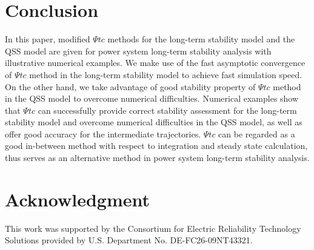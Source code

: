 \documentclass[journal]{IEEEtran}
\begin{document}
\section{Conclusion}\label{sectionconclusion}
In this paper, modified $\Psi tc$ methods for the long-term stability model and the QSS model are given for power system long-term stability analysis with illustrative numerical examples. We make use of the fast asymptotic convergence of $\Psi tc$ method in the long-term stability model to achieve fast simulation speed. On the other hand, we take advantage of good stability property of $\Psi tc$ method in the QSS model to overcome numerical difficulties. Numerical examples show that $\Psi tc$  can successfully provide correct stability assessment for the long-term stability model and overcome numerical difficulties in the QSS model, as well as offer good accuracy for the intermediate trajectories. $\Psi tc$ can be regarded as a good in-between method with respect to integration and steady state calculation, thus serves as an alternative method in power system long-term stability analysis.

\section{Acknowledgment}
This work was supported by the Consortium for Electric Reliability Technology Solutions provided by U.S. Department No. DE-FC26-09NT43321.


















\appendices























\ifCLASSOPTIONcaptionsoff
  \newpage
\fi
\end{document}
